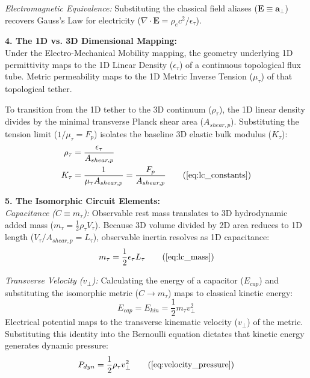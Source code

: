 \vspace{0.2 cm}

\textit{Electromagnetic Equivalence:} Substituting the classical field aliases ($\mathbf{E} \equiv \mathbf{a}_\perp$) recovers Gauss's Law for electricity ($\nabla \cdot \mathbf{E} = \rho_e c^2 / \epsilon_\tau$).

\vspace{0.2 cm}

\textbf{4. The 1D vs. 3D Dimensional Mapping:} \\
Under the Electro-Mechanical Mobility mapping, the geometry underlying 1D permittivity maps to the 1D Linear Density ($\epsilon_{\tau}$) of a continuous topological flux tube. Metric permeability maps to the 1D Metric Inverse Tension ($\mu_{\tau}$) of that topological tether. 

To transition from the 1D tether to the 3D continuum ($\rho_{\tau}$), the 1D linear density divides by the minimal transverse Planck shear area ($A_{shear, p}$). Substituting the tension limit ($1/\mu_{\tau} = F_p$) isolates the baseline 3D elastic bulk modulus ($K_\tau$):
\begin{align}
    \rho_{\tau} &= \frac{\epsilon_{\tau}}{A_{shear, p}} \nonumber \\
    K_\tau &= \frac{1}{\mu_{\tau} A_{shear, p}} = \frac{F_p}{A_{shear, p}} \tag{\ref{eq:lc_constants}}
\end{align}

\textbf{5. The Isomorphic Circuit Elements:} \\
\textit{Capacitance ($C \equiv m_\tau$):} Observable rest mass translates to 3D hydrodynamic added mass ($m_\tau = \frac{1}{2} \rho_{\tau} V_\tau$). Because 3D volume divided by 2D area reduces to 1D length ($V_\tau/A_{shear, p} = L_\tau$), observable inertia resolves as 1D capacitance:
\begin{equation}
    m_\tau = \frac{1}{2} \epsilon_{\tau} L_\tau \tag{\ref{eq:lc_mass}}
\end{equation}

\textit{Transverse Velocity ($v_{\perp}$):} Calculating the energy of a capacitor ($E_{cap}$) and substituting the isomorphic metric ($C \to m_\tau$) maps to classical kinetic energy:
\begin{equation}
    E_{cap} = E_{kin} = \frac{1}{2} m_\tau v_{\perp}^2 \nonumber
\end{equation}
Electrical potential maps to the transverse kinematic velocity ($v_{\perp}$) of the metric. Substituting this identity into the Bernoulli equation dictates that kinetic energy generates dynamic pressure:
\begin{equation}
    P_{dyn} = \frac{1}{2}\rho_{\tau} v_{\perp}^2 \tag{\ref{eq:velocity_pressure}}
\end{equation}

